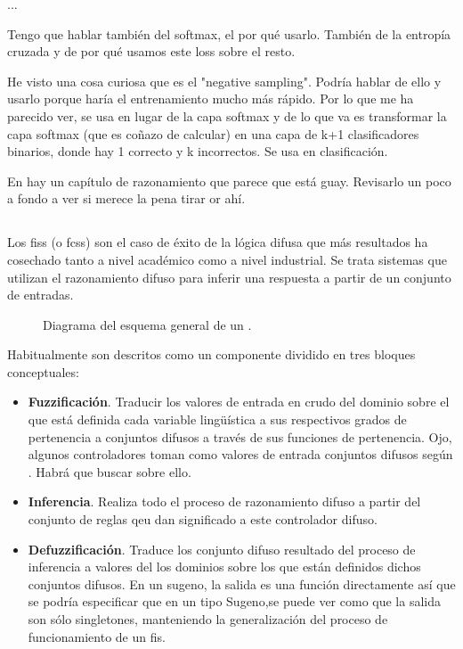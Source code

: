 
...

Tengo que hablar también del softmax, el por qué usarlo. También de la entropía cruzada y de por qué usamos este loss sobre el resto.

He visto una cosa curiosa que es el "negative sampling". Podría hablar de ello y usarlo porque haría el entrenamiento mucho más rápido. Por lo que me ha parecido ver, se usa en lugar de la capa softmax y de lo que va es transformar la capa softmax (que es coñazo de calcular) en una capa de k+1 clasificadores binarios, donde hay 1 correcto y k incorrectos. Se usa en clasificación.

En \cite{Ma2004} hay un capítulo de razonamiento que parece que está guay. Revisarlo un poco a fondo a ver si merece la pena tirar or ahí.

\subsection{}

Los \glspl{fis} (o \glspl{fcs}) son el caso de éxito de la lógica difusa que más resultados ha cosechado tanto a nivel académico como a nivel industrial. Se trata sistemas que utilizan el razonamiento difuso para inferir una respuesta a partir de un conjunto de entradas.

\begin{figure}
	\caption[Diagrama general de un ]{Diagrama del esquema general de un .}
	\label{fig:fis-general-schema}
\end{figure}

Habitualmente son descritos como un componente dividido en tres bloques conceptuales:

\begin{itemize}
	\item \textbf{Fuzzificación}. Traducir los valores de entrada en crudo del dominio sobre el que está definida cada variable lingüística a sus respectivos grados de pertenencia a conjuntos difusos a través de sus funciones de pertenencia. \TODO Ojo, algunos controladores toman como valores de entrada conjuntos difusos según \cite{Ma2004}. Habrá que buscar sobre ello.
	\item \textbf{Inferencia}. Realiza todo el proceso de razonamiento difuso a partir del conjunto de reglas qeu dan significado a este controlador difuso.
	\item \textbf{Defuzzificación}. Traduce los conjunto difuso resultado del proceso de inferencia a valores del los dominios sobre los que están definidos dichos conjuntos difusos. \TODO En un sugeno, la salida es una función directamente así que se podría especificar que en un tipo Sugeno,se puede ver como que la salida son sólo singletones, manteniendo la generalización del proceso de funcionamiento de un \ac{fis}.
\end{itemize}

